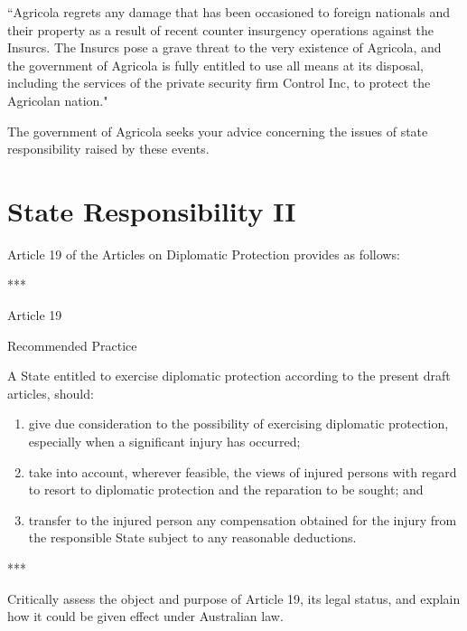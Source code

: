\begin{tutorialquestion}
    \vspace{\baselineskip}
    
    ``Agricola regrets any damage that has been occasioned to foreign nationals and their property as a result of recent counter insurgency operations against the Insurcs. The Insurcs pose a grave threat to the very existence of Agricola, and the government of Agricola is fully entitled to use all means at its disposal, including the services of the private security firm Control Inc, to protect the Agricolan nation."

    \vspace{\baselineskip}
    
    The government of Agricola seeks your advice concerning the issues of state responsibility raised by these events.

\end{tutorialquestion}

\section{State Responsibility II}
\begin{tutorialquestion}
    \flushleft
    Article 19 of the Articles on Diplomatic Protection provides as follows:

    \begin{center}
        *** \\

        \vspace{\baselineskip}

        Article 19

        \vspace{\baselineskip}

        Recommended Practice
    \end{center}
    
    \vspace{\baselineskip}

    A State entitled to exercise diplomatic protection according to the present draft articles, should:
    \begin{enumerate}[label=(\alph*)]
        \item give due consideration to the possibility of exercising diplomatic protection, especially when a significant injury has occurred;
        \item take into account, wherever feasible, the views of injured persons with regard to resort to diplomatic protection and the reparation to be sought; and
        \item transfer to the injured person any compensation obtained for the injury from the responsible State subject to any reasonable deductions.
    \end{enumerate}
    \centerline{***}

    \vspace{\baselineskip}
    
    Critically assess the object and purpose of Article 19, its legal status, and explain how it could be given effect under Australian law.
\end{tutorialquestion}

